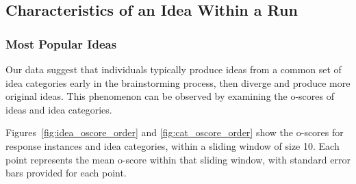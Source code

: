 

\subsection{Characteristics of an Idea Within a Run}

\subsubsection{Most Popular Ideas}
Our data suggest that individuals typically produce ideas from a common set of idea categories early in the brainstorming process, then diverge and produce more original ideas. This phenomenon can be observed by examining the o-scores of ideas and idea categories.

Figures~\ref{fig:idea_oscore_order} and \ref{fig:cat_oscore_order} show the o-scores for response instances and idea categories, within a sliding window of size 10. Each point represents the mean o-score within that sliding window, with standard error bars provided for each point.







